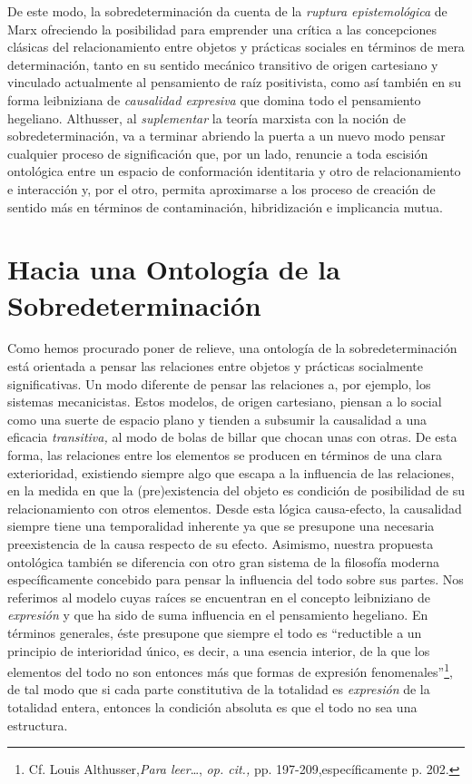 De este modo, la sobredeterminación da cuenta de la \emph{ruptura epistemológica} de Marx ofreciendo la posibilidad para emprender una crítica a las concepciones clásicas del relacionamiento entre objetos y prácticas sociales en términos de mera determinación, tanto en su sentido mecánico transitivo de origen cartesiano y vinculado actualmente al pensamiento de raíz positivista, como así también en su forma leibniziana de \emph{causalidad expresiva} que domina todo el pensamiento hegeliano. Althusser, al \emph{suplementar} la teoría marxista con la noción de sobredeterminación, va a terminar abriendo la puerta a un nuevo modo pensar cualquier proceso de significación que, por un lado, renuncie a toda escisión ontológica entre un espacio de conformación identitaria y otro de relacionamiento e interacción y, por el otro, permita aproximarse a los proceso de creación de sentido más en términos de contaminación, hibridización e implicancia mutua.

\section{Hacia una Ontología de la Sobredeterminación}

Como hemos procurado poner de relieve, una ontología de la sobredeterminación está orientada a pensar las relaciones entre objetos y prácticas socialmente significativas. Un modo diferente de pensar las relaciones a, por ejemplo, los sistemas mecanicistas. Estos modelos, de origen cartesiano, piensan a lo social como una suerte de espacio plano y tienden a subsumir la causalidad a una eficacia \emph{transitiva,} al modo de bolas de billar que chocan unas con otras. De esta forma, las relaciones entre los elementos se producen en términos de una clara exterioridad, existiendo siempre algo que escapa a la influencia de las relaciones, en la medida en que la (pre)existencia del objeto es condición de posibilidad de su relacionamiento con otros elementos. Desde esta lógica causa-efecto, la causalidad siempre tiene una temporalidad inherente ya que se presupone una necesaria  preexistencia de la causa respecto de su efecto. Asimismo, nuestra propuesta ontológica también se diferencia con otro gran sistema de la filosofía moderna específicamente concebido para pensar la influencia del todo sobre sus partes. Nos referimos al modelo cuyas raíces se encuentran en el concepto leibniziano de \emph{expresión} y que ha sido de suma influencia en el pensamiento hegeliano. En términos generales, éste presupone que siempre el todo es \enquote{reductible a un principio de interioridad único, es decir, a una esencia interior, de la que los elementos del todo no son entonces más que formas de expresión fenomenales}\footnote{Cf. Louis Althusser,\emph{Para leer}\ldots, \emph{op. cit.,} pp. 197-209,específicamente p. 202.}, de tal modo que si cada parte constitutiva de la totalidad es \emph{expresión} de la totalidad entera, entonces la condición absoluta es que el todo no sea una estructura.

